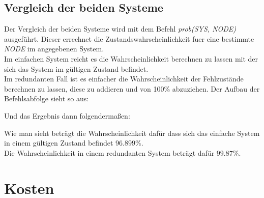 \documentclass[10pt,a4paper]{article}
\begin{document}
\subsection{Vergleich der beiden Systeme}
Der Vergleich der beiden Systeme wird mit dem Befehl \textit{prob(SYS, NODE)} ausgeführt. Dieser errechnet die Zustandswahrscheinlichkeit fuer eine bestimmte \textit{NODE} im angegebenen System.\\
Im einfachen System reicht es die Wahrscheinlichkeit berechnen zu lassen mit der sich das System im gültigen Zustand befindet. \\
Im redundanten Fall ist es einfacher die Wahrscheinlichkeit der Fehlzustände berechnen zu lassen, diese zu addieren und von 100\% abzuziehen.
Der Aufbau der Befehlsabfolge sieht so aus:

Und das Ergebnis dann folgendermaßen:

Wie man sieht beträgt die Wahrscheinlichkeit dafür dass sich das einfache System in einem gültigen Zustand befindet $96.899\%$. \\
Die Wahrscheinlichkeit in einem redundanten System beträgt dafür $99.87\%$.
\section{Kosten}
\end{document}
